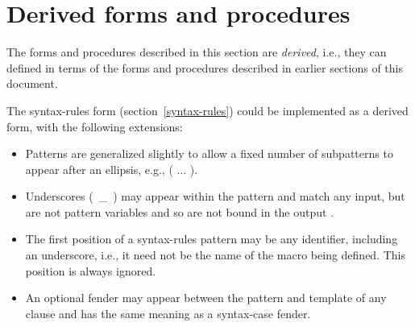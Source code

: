 \section{Derived forms and procedures}
\label{derivedsection}

The forms and procedures described in this section are \emph{derived},
i.e., they can defined in terms of the forms and procedures described
in earlier sections of this document.

The {\cf syntax-rules} form (section~\ref{syntax-rules}) could be
implemented as a derived form, with the following extensions:

\begin{itemize}
 \item Patterns are generalized slightly to allow a fixed number of   
   subpatterns to appear after an ellipsis, e.g.,
   {\cf ( ...  )}.

 \item Underscores (~{\cf \_}~) may appear within the pattern
   and match any input, but are not pattern variables and so
   are not bound in the output .

 \item The first position of a syntax-rules pattern may be any
   identifier, including an underscore, i.e., it need not be the name
   of the macro being defined.
   This position is always ignored.

 \item An optional fender may appear between the pattern and
   template of any clause and has the same meaning as a
   {\cf syntax-case} fender.
\end{itemize}


